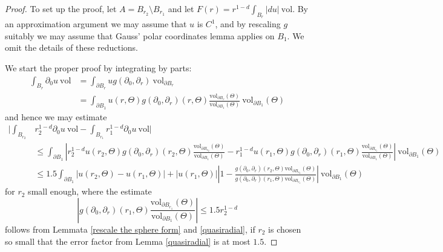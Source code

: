 \documentclass[reqno,12pt,letterpaper]{amsart}
\newcommand{\vol}{\mathrm{vol}}
\theoremstyle{definition}
\numberwithin{equation}{section}
\begin{document}
\begin{proof}
To set up the proof, let $A = B_{r_2} \setminus B_{r_1}$ and let $F(r) = r^{1 - d} \int_{B_r} |du| ~\vol$.
By an approximation argument we may assume that $u$ is $C^1$, and by rescaling $g$ suitably we may assume that Gauss' polar coordinates lemma applies on $B_1$.
We omit the details of these reductions.

We start the proper proof by integrating by parts:
\begin{align*}
\int_{B_r} \partial_0u ~\vol &= \int_{\partial B_r} ug(\partial_0, \partial_r) ~\vol_{\partial B_r} \\
&= \int_{\partial B_1} u(r, \Theta) g(\partial_0, \partial_r)(r, \Theta) \frac{\vol_{\partial B_r}(\Theta)}{\vol_{\partial B_1}(\Theta)} ~\vol_{\partial B_1}(\Theta)
\end{align*}
and hence we may estimate
\begin{align*}
|\int_{B_{r_2}} &r_2^{1 - d} \partial_0u ~\vol -\int_{B_{r_1}} r_1^{1 - d} \partial_0u ~\vol|\\
&\leq \int_{\partial B_1} \left|r_2^{1 - d}u(r_2, \Theta) g(\partial_0, \partial_r)(r_2, \Theta) \frac{\vol_{\partial B_{r_2}}(\Theta)}{\vol_{\partial B_1}(\Theta)}
- r_1^{1 - d}u(r_1, \Theta) g(\partial_0, \partial_r)(r_1, \Theta) \frac{\vol_{\partial B_{r_1}}(\Theta)}{\vol_{\partial B_1}(\Theta)}\right|
~\vol_{\partial B_1}(\Theta) \\
&\leq 1.5 \int_{\partial B_1} |u(r_2, \Theta) - u(r_1, \Theta)| + |u(r_1, \Theta)|
\left|1 - \frac{g(\partial_0, \partial_r)(r_2, \Theta) \vol_{\partial B_{r_2}}(\Theta)}{g(\partial_0, \partial_r)(r_1, \Theta) \vol_{\partial B_{r_1}}(\Theta)}\right| ~\vol_{\partial B_1}(\Theta)
\end{align*}
for $r_2$ small enough, where the estimate
$$\left|g(\partial_0, \partial_r)(r_1, \Theta) \frac{\vol_{\partial B_{r_1}}(\Theta)}{\vol_{\partial B_1}(\Theta)}\right| \leq 1.5 r_2^{1 - d}$$
follows from Lemmata \ref{rescale the sphere form} and \ref{quasiradial}, if $r_2$ is chosen so small that the error factor from Lemma \ref{quasiradial} is at most $1.5$.


\end{proof}
\end{document}
